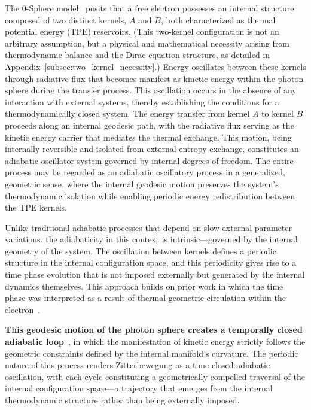 \documentclass[%
 reprint,
 amsmath,amssymb,
 aps,
]{revtex4-1}
\numberwithin{equation}{section}%
\begin{document}
The 0-Sphere model~\cite{hanamura2501.0130} posits that a free electron possesses an internal structure composed of two distinct kernels, $A$ and $B$, both characterized as thermal potential energy (TPE) reservoirs. (This two-kernel configuration is not an arbitrary assumption, but a physical and mathematical necessity arising from thermodynamic balance and the Dirac equation structure, as detailed in Appendix~\ref{subsec:two_kernel_necessity}.) Energy oscillates between these kernels through radiative flux that becomes manifest as kinetic energy within the photon sphere during the transfer process. This oscillation occurs in the absence of any interaction with external systems, thereby establishing the conditions for a thermodynamically closed system. The energy transfer from kernel $A$ to kernel $B$ proceeds along an internal geodesic path, with the radiative flux serving as the kinetic energy carrier that mediates the thermal exchange. This motion, being internally reversible and isolated from external entropy exchange, constitutes an adiabatic oscillator system governed by internal degrees of freedom. The entire process may be regarded as an adiabatic oscillatory process in a generalized, geometric sense, where the internal geodesic motion preserves the system's thermodynamic isolation while enabling periodic energy redistribution between the TPE kernels.

Unlike traditional adiabatic processes that depend on slow external parameter variations, the adiabaticity in this context is intrinsic—governed by the internal geometry of the system. The oscillation between kernels defines a periodic structure in the internal configuration space, and this periodicity gives rise to a time phase evolution that is not imposed externally but generated by the internal dynamics themselves. This approach builds on prior work in which the time phase was interpreted as a result of thermal-geometric circulation within the electron~\cite{hanamura2411.0117}.

\textbf{This geodesic motion of the photon sphere creates a temporally closed adiabatic loop}~\cite{hanamura2507.0128}, in which the manifestation of kinetic energy strictly follows the geometric constraints defined by the internal manifold’s curvature. The periodic nature of this process renders Zitterbewegung as a time-closed adiabatic oscillation, with each cycle constituting a geometrically compelled traversal of the internal configuration space—a trajectory that emerges from the internal thermodynamic structure rather than being externally imposed.
\end{document}
